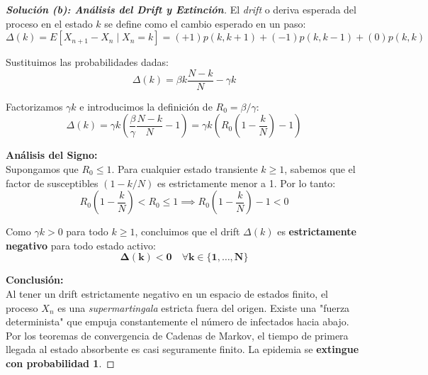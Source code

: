 \documentclass[10pt,a4paper]{article}
\begin{document}
\vspace{5mm}

\begin{proof}[\textbf{Solución (b): Análisis del Drift y Extinción}]
    El \textit{drift} o deriva esperada del proceso en el estado $k$ se define como el cambio esperado en un paso:
    \[ \Delta(k) = E[X_{n+1} - X_n \mid X_n = k] = (+1)p(k, k+1) + (-1)p(k, k-1) + (0)p(k,k) \]
    
    Sustituimos las probabilidades dadas:
    \[ \Delta(k) = \beta k \frac{N-k}{N} - \gamma k \]
    
    Factorizamos $\gamma k$ e introducimos la definición de $R_0 = \beta/\gamma$:
    \[ \Delta(k) = \gamma k \left( \frac{\beta}{\gamma} \frac{N-k}{N} - 1 \right) = \gamma k \left( R_0 \left(1 - \frac{k}{N}\right) - 1 \right) \]
    
    \textbf{Análisis del Signo:} \\
    Supongamos que $R_0 \le 1$. Para cualquier estado transiente $k \ge 1$, sabemos que el factor de susceptibles $(1 - k/N)$ es estrictamente menor a 1.
    Por lo tanto:
    \[ R_0 \left(1 - \frac{k}{N}\right) < R_0 \le 1 \implies R_0 \left(1 - \frac{k}{N}\right) - 1 < 0 \]
    
    Como $\gamma k > 0$ para todo $k \ge 1$, concluimos que el drift $\Delta(k)$ es \textbf{estrictamente negativo} para todo estado activo:
    \[ \mathbf{\Delta(k) < 0 \quad \forall k \in \{1, \dots, N\}} \]
    
    \textbf{Conclusión:} \\
    Al tener un drift estrictamente negativo en un espacio de estados finito, el proceso $X_n$ es una \textit{supermartingala} estricta fuera del origen. Existe una "fuerza determinista" que empuja constantemente el número de infectados hacia abajo. Por los teoremas de convergencia de Cadenas de Markov, el tiempo de primera llegada al estado absorbente es casi seguramente finito. La epidemia se \textbf{extingue con probabilidad 1}.
\end{proof}

\vspace{5mm}
\end{document}
